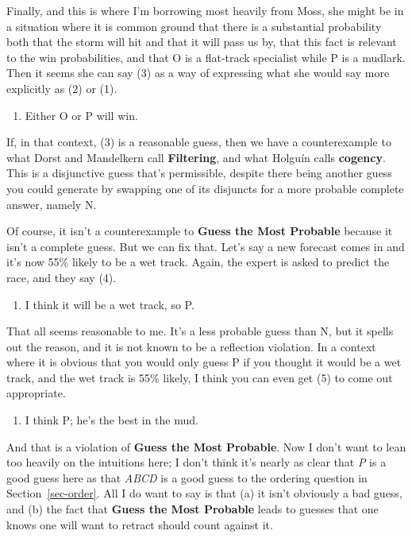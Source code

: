 \documentclass[
  11pt,
  letterpaper,
  DIV=11,
  numbers=noendperiod,
  twoside]{scrartcl}
\providecommand{\tightlist}{%
  \setlength{\itemsep}{0pt}\setlength{\parskip}{0pt}}
\begin{document}
Finally, and this is where I'm borrowing most heavily from Moss, she
might be in a situation where it is common ground that there is a
substantial probability both that the storm will hit and that it will
pass us by, that this fact is relevant to the win probabilities, and
that O is a flat-track specialist while P is a mudlark. Then it seems
she can say (3) as a way of expressing what she would say more
explicitly as (2) or (1).

\begin{enumerate}
\def\labelenumi{(\arabic{enumi})}
\setcounter{enumi}{2}
\tightlist
\item
  Either O or P will win.
\end{enumerate}

If, in that context, (3) is a reasonable guess, then we have a
counterexample to what Dorst and Mandelkern call \textbf{Filtering}, and
what Holguín calls \textbf{cogency}. This is a disjunctive guess that's
permissible, despite there being another guess you could generate by
swapping one of its disjuncts for a more probable complete answer,
namely N.

Of course, it isn't a counterexample to \textbf{Guess the Most Probable}
because it isn't a complete guess. But we can fix that. Let's say a new
forecast comes in and it's now 55\% likely to be a wet track. Again, the
expert is asked to predict the race, and they say (4).

\begin{enumerate}
\def\labelenumi{(\arabic{enumi})}
\setcounter{enumi}{3}
\tightlist
\item
  I think it will be a wet track, so P.
\end{enumerate}

That all seems reasonable to me. It's a less probable guess than N, but
it spells out the reason, and it is not known to be a reflection
violation. In a context where it is obvious that you would only guess P
if you thought it would be a wet track, and the wet track is 55\%
likely, I think you can even get (5) to come out appropriate.

\begin{enumerate}
\def\labelenumi{(\arabic{enumi})}
\setcounter{enumi}{4}
\tightlist
\item
  I think P; he's the best in the mud.
\end{enumerate}

And that is a violation of \textbf{Guess the Most Probable}. Now I don't
want to lean too heavily on the intuitions here; I don't think it's
nearly as clear that \emph{P} is a good guess here as that \emph{ABCD}
is a good guess to the ordering question in Section~\ref{sec-order}. All
I do want to say is that (a) it isn't obviously a bad guess, and (b) the
fact that \textbf{Guess the Most Probable} leads to guesses that one
knows one will want to retract should count against it.
\end{document}
